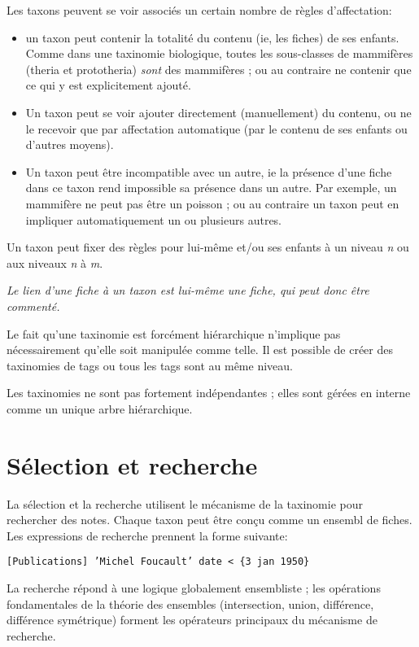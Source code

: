 \documentclass[11pt]{article}
\begin{document}
Les taxons peuvent se voir associés un certain nombre de règles
d'affectation:

\begin{itemize}
\item
  un taxon peut contenir la totalité du contenu (ie, les fiches) de ses
  enfants. Comme dans une taxinomie biologique, toutes les sous-classes
  de mammifères (theria et prototheria) \emph{sont} des mammifères ; ou
  au contraire ne contenir que ce qui y est explicitement ajouté.
\item
  Un taxon peut se voir ajouter directement (manuellement) du contenu,
  ou ne le recevoir que par affectation automatique (par le contenu de
  ses enfants ou d'autres moyens).
\item
  Un taxon peut être incompatible avec un autre, ie la présence d'une
  fiche dans ce taxon rend impossible sa présence dans un autre. Par
  exemple, un mammifère ne peut pas être un poisson ; ou au contraire un
  taxon peut en impliquer automatiquement un ou plusieurs autres.
\end{itemize}

Un taxon peut fixer des règles pour lui-même et/ou ses enfants à un
niveau \emph{n} ou aux niveaux \emph{n }à \emph{m}.

\emph{Le lien d'une fiche à un taxon est lui-même une fiche, qui peut
donc être commenté.}

Le fait qu'une taxinomie est forcément hiérarchique n'implique pas
nécessairement qu'elle soit manipulée comme telle. Il est possible de
créer des taxinomies de \og tags \fg{} ou tous les tags sont au même
niveau.

Les taxinomies ne sont pas fortement indépendantes ; elles sont gérées
en interne comme un unique arbre hiérarchique.

\section{Sélection et recherche}\label{suxe9lection-et-recherche}

La sélection et la recherche utilisent le mécanisme de la taxinomie pour
rechercher des notes. Chaque taxon peut être conçu comme un ensembl de
fiches. Les expressions de recherche prennent la forme suivante:

\texttt{{[}Publications{]} 'Michel Foucault' date < \{3 jan 1950\}}

La recherche répond à une logique globalement ensembliste ; les
opérations fondamentales de la théorie des ensembles (intersection,
union, différence, différence symétrique) forment les opérateurs
principaux du mécanisme de recherche.
\end{document}
